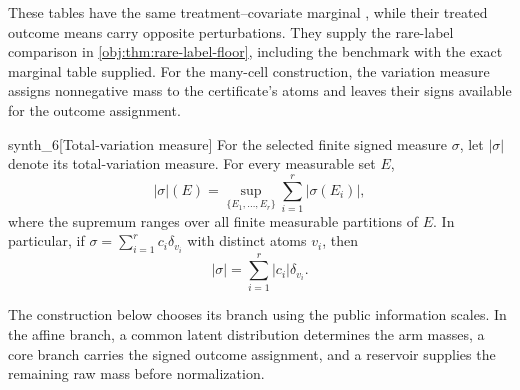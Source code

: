 These tables have the same treatment--covariate marginal , while their treated outcome means carry opposite perturbations. They supply the rare-label comparison in \cref{obj:thm:rare-label-floor}, including the benchmark with the exact marginal table supplied. For the many-cell construction, the variation measure assigns nonnegative mass to the certificate's atoms and leaves their signs available for the outcome assignment.

\begin{definitionv}{synth_6}[Total-variation measure]
For the selected finite signed measure \(\sigma\), let \(|\sigma|\) denote its total-variation measure. For every measurable set \(E\),
\[
|\sigma|(E)=\sup_{\{E_1,\ldots,E_r\}}\sum_{i=1}^{r}|\sigma(E_i)|,
\]
where the supremum ranges over all finite measurable partitions of \(E\). In particular, if \(\sigma=\sum_{i=1}^{r}c_i\delta_{v_i}\) with distinct atoms \(v_i\), then
\[
|\sigma|=\sum_{i=1}^{r}|c_i|\delta_{v_i}.
\]
\end{definitionv}

The construction below chooses its branch using the public information scales. In the affine branch, a common latent distribution determines the arm masses, a core branch carries the signed outcome assignment, and a reservoir supplies the remaining raw mass before normalization.

